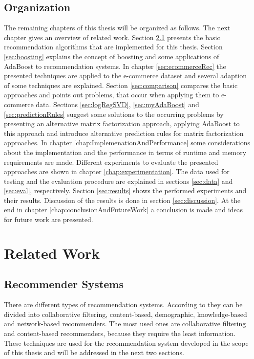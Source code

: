 \documentclass[10pt]{reportMaster}
\begin{document}
\section{Organization}
The remaining chapters of this thesis will be organized as follows.
The next chapter gives an overview of related work.
Section \ref{sec:recommenderSystems} presents the basic recommendation algorithms that are implemented for this thesis.
Section \ref{sec:boosting} explains the concept of boosting and some applications of AdaBoost to recommendation systems.
In chapter \ref{sec:ecommerceRec} the presented techniques are applied to the e-commerce dataset and several adaption of some techniques are explained.
Section \ref{sec:comparison} compares the basic approaches and points out problems, that occur when applying them to e-commerce data.
Sections \ref{sec:logRegSVD}, \ref{sec:myAdaBoost} and \ref{sec:predictionRules} suggest some solutions to the occurring problems by presenting an alternative matrix factorization approach, applying AdaBoost to this approach and introduce alternative prediction rules for matrix factorization approaches. 
In chapter \ref{chap:ImplemenationAndPerformance} some considerations about the implementation and the performance in terms of runtime and memory requirements are made.
Different experiments to evaluate the presented approaches are shown in chapter \ref{chap:experimentation}.
The data used for testing and the evaluation procedure are explained in sections \ref{sec:data} and \ref{sec:eval}, respectively.
Section \ref{sec:results} shows the performed experiments and their results.
Discussion of the results is done in section \ref{sec:discussion}.
At the end in chapter \ref{chap:conclusionAndFutureWork} a conclusion is made and ideas for future work are presented.






\chapter{Related Work}
\label{sec:relatedWork}

\section{Recommender Systems}
\label{sec:recommenderSystems}
There are different types of recommendation systems.
According to \cite{hybridSurvey} they can be divided into collaborative filtering, content-based, demographic, knowledge-based and network-based recommenders.
The most used ones are collaborative filtering and content-based recommenders, because they require the least information.
These techniques are used for the recommendation system developed in the scope of this thesis and will be addressed in the next two sections.
\end{document}
